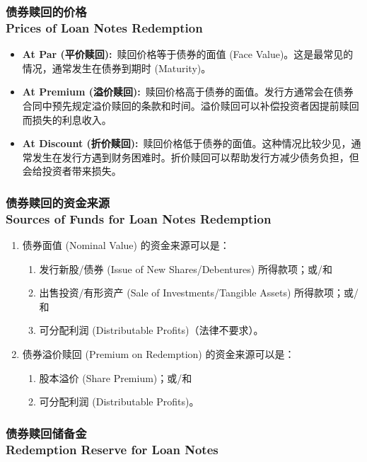 \documentclass{article}
\begin{document}
\subsubsection{债券赎回的价格\\Prices of Loan Notes Redemption}

\begin{itemize}
    \item \textbf{At Par (平价赎回):}\ 赎回价格等于债券的面值 (Face Value)。这是最常见的情况，通常发生在债券到期时 (Maturity)。
    \item \textbf{At Premium (溢价赎回):}\ 赎回价格高于债券的面值。发行方通常会在债券合同中预先规定溢价赎回的条款和时间。溢价赎回可以补偿投资者因提前赎回而损失的利息收入。
    \item \textbf{At Discount (折价赎回):}\ 赎回价格低于债券的面值。这种情况比较少见，通常发生在发行方遇到财务困难时。折价赎回可以帮助发行方减少债务负担，但会给投资者带来损失。
\end{itemize}

\subsubsection{债券赎回的资金来源\\Sources of Funds for Loan Notes Redemption}

\begin{enumerate}[label=\alph*)]
    \item 债券面值 (Nominal Value) 的资金来源可以是：
        \begin{enumerate}[label=\roman*)]
            \item 发行新股/债券 (Issue of New Shares/Debentures) 所得款项；或/和
            \item 出售投资/有形资产 (Sale of Investments/Tangible Assets) 所得款项；或/和
            \item 可分配利润 (Distributable Profits)（法律不要求）。
        \end{enumerate}
    \item 债券溢价赎回 (Premium on Redemption) 的资金来源可以是：
        \begin{enumerate}[label=\roman*)]
            \item 股本溢价 (Share Premium)；或/和
            \item 可分配利润 (Distributable Profits)。
        \end{enumerate}
\end{enumerate}

\subsubsection{债券赎回储备金\\Redemption Reserve for Loan Notes}
\end{document}
